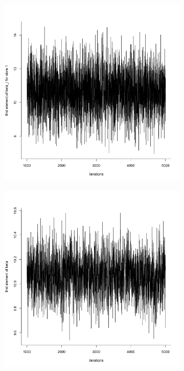 \documentclass[11pt]{article}
\begin{document}
\begin{figure}
    \centering
    \begin{subfigure}[t]{0.45\textwidth}
        \centering
        \includegraphics[width=\linewidth]{Ex5/figures/tra_betai.png} 
    \end{subfigure}
    \hfill
    \begin{subfigure}[t]{0.45\textwidth}
        \centering
        \includegraphics[width=\linewidth]{Ex5/figures/tra_beta.png} 
    \end{subfigure}


\end{figure}
\end{document}
